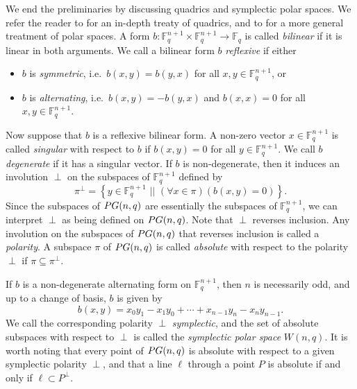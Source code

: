 \documentclass[a4paper]{article}
\theoremstyle{definition}
\newcommand{\FF}{\mathbb F}
\newcommand{\sett}[2]{ \left\{ #1 \, \, || \, \, #2 \right \} }
\newcommand{\pg}{\textnormal{PG}}
\begin{document}
We end the preliminaries by discussing quadrics and symplectic polar spaces.
We refer the reader to \cite[\S 1]{hirschfeldthas} for an in-depth treaty of quadrics, and to \cite{Cameron15} for a more general treatment of polar spaces.
A form $b: \FF_q^{n+1} \times \FF_q^{n+1} \to \FF_q$ is called \emph{bilinear} if it is linear in both arguments.
We call a bilinear form $b$ \emph{reflexive} if either
\begin{itemize}
 \item $b$ is \emph{symmetric}, i.e.\ $b(x,y) = b(y,x)$ for all $x,y \in \FF_q^{n+1}$, or
 \item $b$ is \emph{alternating}, i.e.\ $b(x,y) = -b(y,x)$ and $b(x,x) = 0$ for all $x,y \in \FF_q^{n+1}$.
\end{itemize}
Now suppose that $b$ is a reflexive bilinear form. 
A non-zero vector $x \in \FF_q^{n+1}$ is called \emph{singular} with respect to $b$ if $b(x,y) = 0$ for all $y\in \FF_q^{n+1}$.
We call $b$ \emph{degenerate} if it has a singular vector.
If $b$ is non-degenerate, then it induces an involution $\perp$ on the subspaces of $\FF_q^{n+1}$ defined by
\[
 \pi^\perp = \sett{y \in \FF_q^{n+1}}{(\forall x \in\pi)(b(x,y) = 0)}.
\]
Since the subspaces of $\pg(n,q)$ are essentially the subspaces of $\FF_q^{n+1}$, we can interpret $\perp$ as being defined on $\pg(n,q)$.
Note that $\perp$ reverses inclusion.
Any involution on the subspaces of $\pg(n,q)$ that reverses inclusion is called a \emph{polarity}.
A subspace $\pi$ of $\pg(n,q)$ is called \emph{absolute} with respect to the polarity $\perp$ if $\pi \subseteq \pi^\perp$.

If $b$ is a non-degenerate alternating form on $\FF_q^{n+1}$, then $n$ is necessarily odd, and up to a change of basis, $b$ is given by
\[
 b(x,y) = x_0 y_1 - x_1 y_0 + \cdots + x_{n-1} y_n - x_n y_{n-1}.
\]
We call the corresponding polarity $\perp$ \emph{symplectic}, and the set of absolute subspaces with respect to $\perp$ is called the \emph{symplectic polar space} $W(n,q)$.
It is worth noting that every point of $\pg(n,q)$ is absolute with respect to a given symplectic polarity $\perp$, and that a line $\ell$ through a point $P$ is absolute if and only if $\ell \subset P^\perp$.
\end{document}
